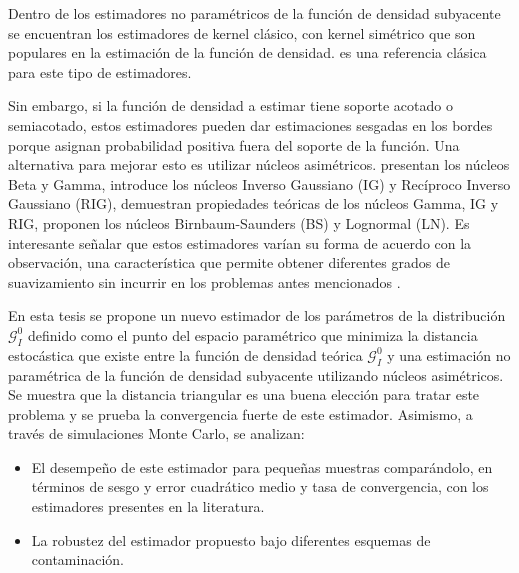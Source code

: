 Dentro de los estimadores no paramétricos de la función de densidad subyacente se encuentran los estimadores de kernel clásico, con kernel simétrico que son populares en la estimación de la función de densidad.  \citet{Silverman1986} es una referencia clásica para este tipo de estimadores.

Sin embargo, si la función de densidad a estimar tiene soporte acotado o semiacotado, estos estimadores pueden dar estimaciones sesgadas en los bordes porque asignan probabilidad positiva fuera del soporte de la función. 
Una alternativa para mejorar esto es utilizar núcleos asimétricos. \citet{chen1999, chensx2000} presentan los núcleos Beta y Gamma, \citet {Scaillet2004} introduce los núcleos Inverso Gaussiano (IG) y Recíproco Inverso Gaussiano (RIG), \citet {bouezmarni2005} demuestran propiedades teóricas de los núcleos Gamma, IG y RIG, \citet{Jin2003}  proponen los núcleos Birnbaum-Saunders (BS) y Lognormal (LN). Es interesante señalar que  estos estimadores varían su forma de acuerdo con la observación, una característica que permite obtener diferentes grados de suavizamiento sin incurrir en los problemas antes mencionados \citep{Scaillet2004}. 

En esta tesis se propone un nuevo  estimador de los parámetros de la distribución $\mathcal{G}_I^0$ definido como el punto del espacio paramétrico que minimiza la distancia estocástica que existe entre la función de densidad teórica $\mathcal{G}_I^0$ y una estimación no paramétrica de la función de densidad subyacente utilizando núcleos asimétricos. Se muestra que la distancia triangular es una buena elección para tratar este problema y se prueba la convergencia fuerte de este estimador. Asimismo, a través de simulaciones Monte Carlo, se analizan:
\begin{itemize}
	\item El desempeño de este estimador para pequeñas muestras comparándolo, en términos de sesgo y error cuadrático medio y tasa de convergencia, con los estimadores presentes en la literatura.
	\item La robustez del estimador propuesto bajo diferentes esquemas de contaminación.
\end{itemize}  

